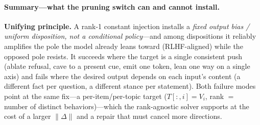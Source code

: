 \paragraph{Summary---what the pruning switch can and cannot install.}
\begin{table}[t]
\centering\small
{}
\caption{Behaviors installable via the pruning switch (Gemma2-2B).}
\label{tab:inj-summary}
\end{table}

\noindent\textbf{Unifying principle.} A rank-1 constant injection installs a \emph{fixed output bias /
uniform disposition, not a conditional policy}---and among dispositions it reliably amplifies the pole
the model already leans toward (RLHF-aligned) while the opposed pole resists. It succeeds where the
target is a single consistent push (ablate refusal, cave to a present cue, emit one token, lean one way
on a single axis) and fails where the desired output depends on each input's content (a different fact
per question, a different stance per statement). Both failure modes point at the same fix---a
per-item/per-topic target ($T[:,i]=V_i$, rank $=$ number of distinct behaviors)---which the
rank-agnostic solver supports at the cost of a larger $\lVert\Delta\rVert$ and a repair that must
cancel more directions.
